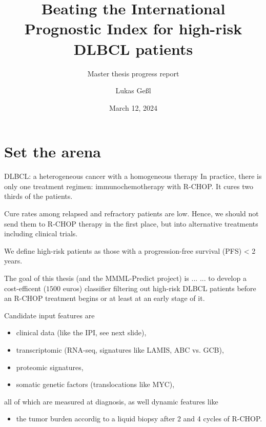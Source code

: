 \documentclass[10pt, aspectratio=169]{beamer}
\title{Beating the International Prognostic Index for high-risk DLBCL patients}
\subtitle{Master thesis progress report}
\date{March 12, 2024}
\author{Lukas Geßl}
\institute{Chair of Statistical Bioinformatics, Regensburg University}
\begin{document}
\maketitle

\section{Set the arena}

\begin{frame}{DLBCL: a heterogeneous cancer with a homogeneous therapy}
  In practice, there is only one treatment regimen: immunochemotherapy with R-CHOP. 
  It cures two thirds of the patients.

  Cure rates among relapsed and refractory patients are low. Hence, we should not send 
  them to R-CHOP therapy in the first place, but into alternative treatments including 
  clinical trials.
  
  We define \alert{high-risk} patients as those with a 
  \alert{progression-free survival (PFS) < 2 years}.

  \begin{alertblock}{The goal of this thesis (and the MMML-Predict project) is ...}
    ... to develop a \alert{cost-efficent ($\num{1500}$ euros) classifier filtering out 
    high-risk DLBCL patients} before an R-CHOP treatment begins or at least at an early 
    stage of it.
  \end{alertblock}
\end{frame}

\begin{frame}{}
  Candidate input features are 
  \begin{itemize}
    \item clinical data (like the IPI, see next slide),
    \item transcriptomic (RNA-seq, signatures like LAMIS, ABC vs. GCB),
    \item proteomic signatures,
    \item somatic genetic factors (translocations like MYC),
  \end{itemize}
  all of which are measured \alert{at diagnosis}, as well \alert{dynamic} features like 
  \begin{itemize}
    \item the tumor burden accordig to a liquid biopsy after 2 and 4 cycles of R-CHOP. 
  \end{itemize}

\end{frame}
\end{document}
